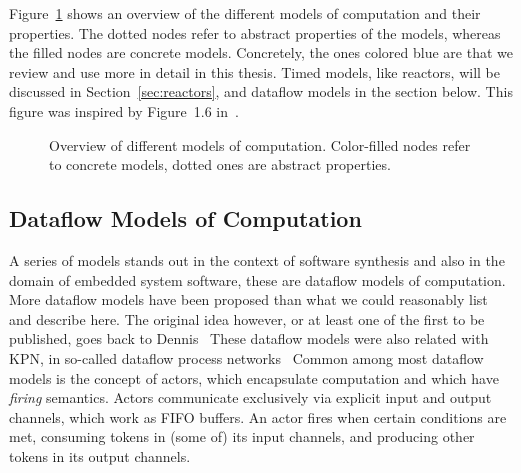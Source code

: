 Figure~\ref{fig:dataflow_mocs} shows an overview of the different models of computation and their properties.
The dotted nodes refer to abstract properties of the models, whereas the filled nodes are concrete models.
Concretely, the ones colored blue are that we review and use more in detail in this thesis.
Timed models, like reactors, will be discussed in Section~\ref{sec:reactors}, and dataflow models in the section below.
This figure was inspired by Figure~1.6 in~\cite{Ptolemaeus:14:SystemDesign}.

\begin{figure}[h]
	\centering
   \resizebox{1.00\textwidth}{!}{}
	\caption{Overview of different models of computation. Color-filled nodes refer to concrete models, dotted ones are abstract properties. }
	\label{fig:dataflow_mocs}
\end{figure}


\subsection{Dataflow Models of Computation}

A series of models stands out in the context of software synthesis and also in the domain of embedded system software, these are dataflow models of computation.
More dataflow models have been proposed than what we could reasonably list and describe here.
The original idea however, or at least one of the first to be published, goes back to Dennis~\cite{dennis1974first,dennis1986data}
These dataflow models were also related with \ac{KPN}, in so-called dataflow process networks~\cite{lee1995dataflow,lee_matsikoudis_semantics}
Common among most dataflow models is the concept of actors, which encapsulate computation and which have \emph{firing} semantics.
Actors communicate exclusively via explicit input and output channels, which work as \acs{FIFO} buffers.
An actor fires when certain conditions are met, consuming tokens in (some of) its input channels, and producing other tokens in its output channels.

